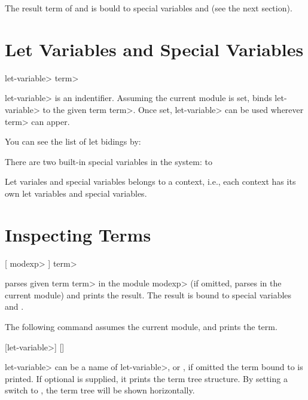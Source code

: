 The result term of  and  is bould to 
special variables  and  (see the next
section). 

\section{Let Variables and Special Variables}

 \<let-variable> \kbd{=} \<term> 

\<let-variable> is an indentifier. Assuming the current module is set, 
 binds \<let-variable> to the given term \<term>.
Once set, \<let-variable> can be used wherever \<term> can apper.

You can see the list of let bidings by:


There are two built-in special variables in the system:
\paralign to 

Let variales and special variables belongs to a context, i.e., each
context has its own let variables and special variables.

\section{Inspecting Terms}
 [ \<modexp> \kbd{:}] \<term> 

 parses given term \<term> in the module \<modexp> (if
omitted, parses in the current module) and prints the result.
The result is bound to special variables  and
. 

The following  command assumes the current module, and
prints the term.

 [\<let-variable>] []

\<let-variable> can be a name of \<let-variable>,  or
, if omitted the term bound to  is
printed.  If optional  is supplied, it prints the term tree 
structure. By setting a switch  to 
, the term tree will be shown horizontally.

